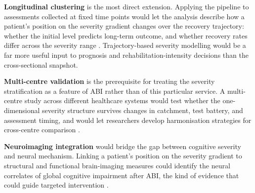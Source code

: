 \textbf{Longitudinal clustering} is the most direct extension. Applying the pipeline to assessments collected at fixed time points would let the analysis describe how a patient's position on the severity gradient changes over the recovery trajectory: whether the initial level predicts long-term outcome, and whether recovery rates differ across the severity range \parencite{ponsford2014longitudinal}. Trajectory-based severity modelling would be a far more useful input to prognosis and rehabilitation-intensity decisions than the cross-sectional snapshot.

\textbf{Multi-centre validation} is the prerequisite for treating the severity stratification as a feature of ABI rather than of this particular service. A multi-centre study across different healthcare systems would test whether the one-dimensional severity structure survives changes in catchment, test battery, and assessment timing, and would let researchers develop harmonisation strategies for cross-centre comparison \parencite{maas2017traumatic}.

\textbf{Neuroimaging integration} would bridge the gap between cognitive severity and neural mechanism. Linking a patient's position on the severity gradient to structural and functional brain-imaging measures could identify the neural correlates of global cognitive impairment after ABI, the kind of evidence that could guide targeted intervention \parencite{saatman2008classification, maas2017traumatic}.
